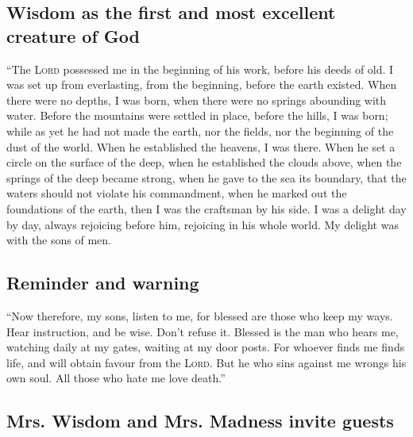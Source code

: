 \hypertarget{wisdom-as-the-first-and-most-excellent-creature-of-god}{%
\subsection{Wisdom as the first and most excellent creature of
God}\label{wisdom-as-the-first-and-most-excellent-creature-of-god}}

 ``The \textsc{Lord} possessed me in the beginning of his
work, before his deeds of old.  I was set up from
everlasting, from the beginning, before the earth existed.
 When there were no depths, I was born, when there were
no springs abounding with water.  Before the mountains
were settled in place, before the hills, I was born; 
while as yet he had not made the earth, nor the fields, nor the
beginning of the dust of the world.  When he established
the heavens, I was there. When he set a circle on the surface of the
deep,  when he established the clouds above, when the
springs of the deep became strong,  when he gave to the
sea its boundary, that the waters should not violate his commandment,
when he marked out the foundations of the earth,  then I
was the craftsman by his side. I was a delight day by day, always
rejoicing before him,  rejoicing in his whole world. My
delight was with the sons of men.

\hypertarget{reminder-and-warning}{%
\subsection{Reminder and warning}\label{reminder-and-warning}}

 ``Now therefore, my sons, listen to me, for blessed are
those who keep my ways.  Hear instruction, and be wise.
Don't refuse it.  Blessed is the man who hears me,
watching daily at my gates, waiting at my door posts. 
For whoever finds me finds life, and will obtain favour from the
\textsc{Lord}.  But he who sins against me wrongs his own
soul. All those who hate me love death.''

\hypertarget{mrs.-wisdom-and-mrs.-madness-invite-guests}{%
\subsection{Mrs. Wisdom and Mrs. Madness invite
guests}\label{mrs.-wisdom-and-mrs.-madness-invite-guests}}

